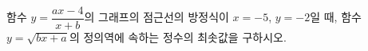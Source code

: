 함수 $y=\dfrac{ax-4}{x+b}$의 그래프의 점근선의 방정식이 $x=-5$, $y=-2$일 때, 함수 $y=\sqrt{bx+a}$의 정의역에 속하는 정수의 최솟값을 구하시오. 
